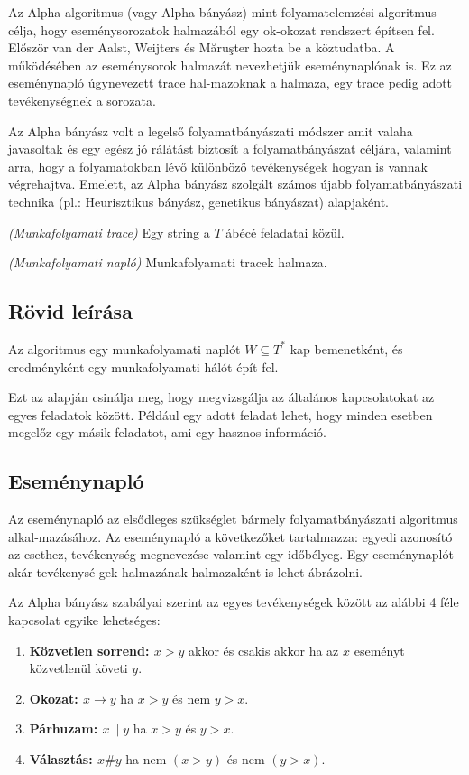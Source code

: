 

Az Alpha algoritmus (vagy Alpha bányász) mint folyamatelemzési algoritmus célja, hogy eseménysorozatok halmazából egy ok-okozat rendszert építsen fel. Először van der Aalst, Weijters és Măruşter hozta be a köztudatba. A működésében az eseménysorok halmazát nevezhetjük eseménynaplónak is. Ez az eseménynapló úgynevezett trace hal\hyp{}mazoknak a halmaza, egy trace pedig adott tevékenységnek a sorozata.

Az Alpha bányász volt a legelső folyamatbányászati módszer amit valaha javasoltak és egy egész jó rálátást biztosít a folyamatbányászat céljára, valamint arra, hogy a folyamatokban lévő különböző tevékenységek hogyan is vannak végrehajtva. Emelett, az Alpha bányász szolgált számos újabb folyamatbányászati technika (pl.: Heurisztikus bányász, genetikus bányászat) alapjaként.
	
\begin{definition}{\textit{(Munkafolyamati trace)}} Egy string a $T$ ábécé feladatai közül.\end{definition}
\begin{definition}{\textit{(Munkafolyamati napló)}} Munkafolyamati tracek halmaza.\end{definition}

\subsection{Rövid leírása}	

Az algoritmus egy munkafolyamati naplót $W \subseteq  T^*$ kap bemenetként, és eredményként egy munkafolyamati hálót épít fel.

Ezt az alapján csinálja meg, hogy megvizsgálja az általános kapcsolatokat az egyes feladatok között. Például egy adott feladat lehet, hogy minden esetben megelőz egy másik feladatot, ami egy hasznos információ.

\subsection{Eseménynapló}
Az eseménynapló az elsődleges szükséglet bármely folyamatbányászati algoritmus alkal\hyp{}mazásához. Az eseménynapló a következőket tartalmazza: egyedi azonosító az esethez, tevékenység megnevezése valamint egy időbélyeg. Egy eseménynaplót akár tevékenysé\hyp{}gek halmazának halmazaként is lehet ábrázolni.

Az Alpha bányász szabályai szerint az egyes tevékenységek között az alábbi 4 féle kapcsolat egyike lehetséges:
\begin{enumerate}
\item \textbf{Közvetlen sorrend: $x > y$} akkor és csakis akkor ha az $x$ eseményt közvetlenül követi $y$.
\item \textbf{Okozat: $x \rightarrow y$} ha $x > y$ és nem $y > x$.
\item \textbf{Párhuzam: $x \parallel y$} ha $x > y$ és $y > x$.
\item \textbf{Választás: $x \# y$} ha nem $(x > y)$ és nem $(y > x)$.
\end{enumerate}

